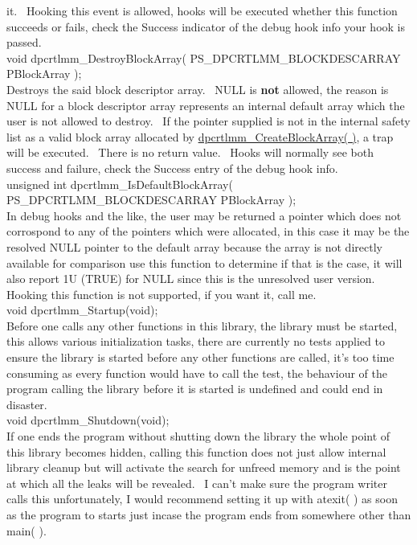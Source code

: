 \documentclass{article}
\begin{document}
it.~
Hooking this event is allowed, hooks will be executed whether this
function
succeeds or fails, check the Success indicator of the debug hook info
your
hook is passed.
\\
void dpcrtlmm\_DestroyBlockArray(
PS\_DPCRTLMM\_BLOCKDESCARRAY
PBlockArray );
\\
Destroys the said block descriptor array.~ NULL is \textbf{not}
allowed, the reason is NULL for a block descriptor array represents an
internal default array which the user is not allowed to destroy.~
If the pointer supplied is not in the internal safety list as a valid
block
array allocated by \href{#CreateBlockArray}{dpcrtlmm\_CreateBlockArray(
)}, a trap will be executed.~ There is no return value.~
Hooks
will normally see both success and failure, check the Success entry of
the debug hook info.
\\
unsigned int dpcrtlmm\_IsDefaultBlockArray(
PS\_DPCRTLMM\_BLOCKDESCARRAY
PBlockArray );
\\
In debug hooks and the like, the user may be returned a pointer which
does not corrospond to any of the pointers which were allocated, in
this
case it may be the resolved NULL pointer to the default array because
the
array is not directly available for comparison use this function to
determine
if that is the case, it will also report 1U (TRUE) for NULL since this
is the unresolved user version.~ Hooking this function is not
supported,
if you want it, call me.
\\
void dpcrtlmm\_Startup(void);
\\
Before one calls any other functions in this library, the library must
be started, this allows various initialization tasks, there are
currently
no tests applied to ensure the library is started before any other
functions
are called, it's too time consuming as every function would have to
call
the test, the behaviour of the program calling the library before it is
started is undefined and could end in disaster.
\\
void dpcrtlmm\_Shutdown(void);
\\
If one ends the program without shutting down the library the whole
point of this library becomes hidden, calling this function does not
just
allow internal library cleanup but will activate the search for unfreed
memory and is the point at which all the leaks will be revealed.~
I can't make sure the program writer calls this unfortunately, I would
recommend setting it up with atexit( ) as soon as the program to starts
just incase the program ends from somewhere other than main( ).~
\end{document}
